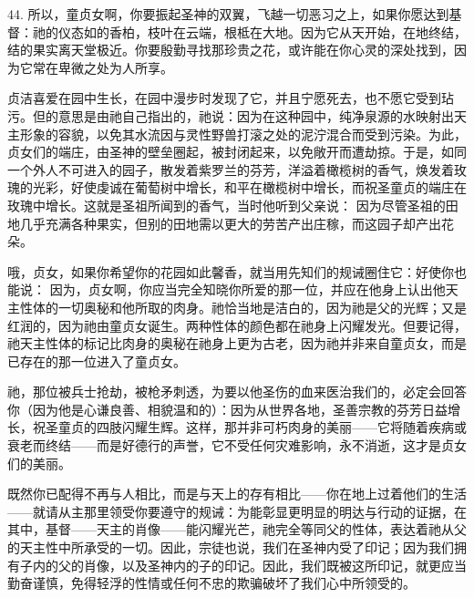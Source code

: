 44. 所以，童贞女啊，你要振起圣神的双翼，飞越一切恶习之上，如果你愿达到基督：祂的仪态如的香柏，枝叶在云端，根柢在大地。因为它从天开始，在地终结，结的果实离天堂极近。你要殷勤寻找那珍贵之花，或许能在你心灵的深处找到，因为它常在卑微之处为人所享。\par

贞洁喜爱在园中生长，在园中漫步时发现了它，并且宁愿死去，也不愿它受到玷污。但的意思是由祂自己指出的，祂说：因为在这种园中，纯净泉源的水映射出天主形象的容貌，以免其水流因与灵性野兽打滚之处的泥泞混合而受到污染。为此，贞女们的端庄，由圣神的壁垒圈起，被封闭起来，以免敞开而遭劫掠。于是，如同一个外人不可进入的园子，散发着紫罗兰的芬芳，洋溢着橄榄树的香气，焕发着玫瑰的光彩，好使虔诚在葡萄树中增长，和平在橄榄树中增长，而祝圣童贞的端庄在玫瑰中增长。这就是圣祖所闻到的香气，当时他听到父亲说： 因为尽管圣祖的田地几乎充满各种果实，但别的田地需以更大的劳苦产出庄稼，而这园子却产出花朵。\par

哦，贞女，如果你希望你的花园如此馨香，就当用先知们的规诫圈住它：好使你也能说： 因为，贞女啊，你应当完全知晓你所爱的那一位，并应在他身上认出他天主性体的一切奥秘和他所取的肉身。祂恰当地是洁白的，因为祂是父的光辉；又是红润的，因为祂由童贞女诞生。两种性体的颜色都在祂身上闪耀发光。但要记得，祂天主性体的标记比肉身的奥秘在祂身上更为古老，因为祂并非来自童贞女，而是已存在的那一位进入了童贞女。\par

祂，那位被兵士抢劫，被枪矛刺透，为要以他圣伤的血来医治我们的，必定会回答你（因为他是心谦良善、相貌温和的）：因为从世界各地，圣善宗教的芬芳日益增长，祝圣童贞的四肢闪耀生辉。这样，那并非可朽肉身的美丽——它将随着疾病或衰老而终结——而是好德行的声誉，它不受任何灾难影响，永不消逝，这才是贞女们的美丽。\par

既然你已配得不再与人相比，而是与天上的存有相比——你在地上过着他们的生活——就请从主那里领受你要遵守的规诫：为能彰显更明显的明达与行动的证据，在其中，基督——天主的肖像——能闪耀光芒，祂完全等同父的性体，表达着祂从父的天主性中所承受的一切。因此，宗徒也说，我们在圣神内受了印记；因为我们拥有子内的父的肖像，以及圣神内的子的印记。因此，我们既被这所印记，就更应当勤奋谨慎，免得轻浮的性情或任何不忠的欺骗破坏了我们心中所领受的。\par

